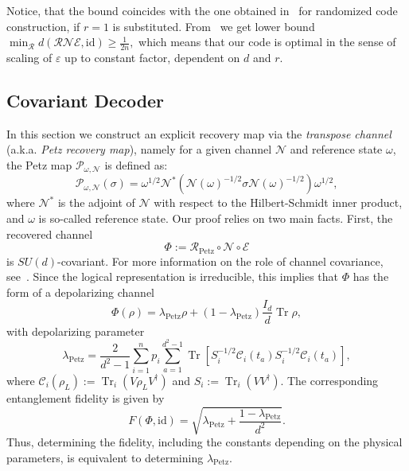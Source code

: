 \documentclass[10pt,twocolumn,superscriptaddress,aps,amsmath,amssymb,citeautoscript,floatfix,prx,longbibliography]{revtex4-2}
\theoremstyle{plain}
\theoremstyle{plain}
\theoremstyle{plain}
\theoremstyle{plain}
\theoremstyle{plain}
\theoremstyle{plain}
\begin{document}
Notice, that the bound coincides with the one obtained in~\cite{Kong2022} for randomized code construction, if $r=1$ is substituted. From~\cite{Faist2020} we get lower bound
$
        \min _{\mathcal{R}} d(\mathcal{R} \mathcal{N} \mathcal{E}, \mathrm{id})\geq \frac{1}{2n},
$
which means that our code is optimal in the sense of scaling of $\varepsilon$ up to constant factor, dependent on $d$ and $r$.

\subsection{Covariant Decoder}\label{subsec:main_decoder}


In this section we construct an explicit recovery map via the \textit{transpose channel} (a.k.a. \textit{Petz recovery map}), namely for a given channel $\mathcal{N}$ and reference state $\omega$, the Petz map $\mathcal{P}_{\omega, \mathcal{N}}$ is defined as:
    \[
        \mathcal{P}_{\omega, \mathcal{N}}(\sigma)=\omega^{1 / 2} \mathcal{N}^*\left(\mathcal{N}(\omega)^{-1 / 2} \sigma \mathcal{N}(\omega)^{-1 / 2}\right) \omega^{1 / 2},
    \]
where $\mathcal{N}^*$ is the adjoint of $\mathcal{N}$ with respect to the Hilbert-Schmidt inner product, and $\omega$ is so-called reference state.
Our proof relies on two main facts. First, the recovered channel
\[
    \Phi:=\mathcal R_{\mathrm{Petz}}\circ \mathcal N\circ \mathcal E
\]
is $SU(d)$-covariant. For more information on the role of channel covariance, see~\cite{Zhou2021, Alexander2025}. Since the logical representation is irreducible, this implies that
\(\Phi\) has the form of a depolarizing channel
\[
    \Phi(\rho)=\lambda_{\mathrm{Petz}} \rho+\left(1-\lambda_{\mathrm{Petz}}\right) \frac{I_d}{d} \operatorname{Tr} \rho,
\]
with depolarizing parameter
\begin{equation}\label{eq:lambda_P}
\lambda_{\mathrm{Petz}} =\frac{2}{d^2-1} \sum_{i=1}^n p_i \sum_{a=1}^{d^2-1} \operatorname{Tr}\left[S_i^{-1 / 2} \mathcal{C}_i\left(t_a\right) S_i^{-1 / 2} \mathcal{C}_i\left(t_a\right)\right],
\end{equation}
where $\mathcal{C}_i\left(\rho_L\right):=\operatorname{Tr}_i\left(V \rho_L V^{\dagger}\right)$ and $S_i:=\operatorname{Tr}_i\left(V V^{\dagger}\right)$. The corresponding entanglement fidelity is given by 
\[
    F(\Phi, \mathrm{id})=\sqrt{\lambda_{\mathrm{Petz}}+\frac{1-\lambda_{\mathrm{Petz}}}{d^2}}.
\]
Thus, determining the fidelity, including the constants depending on the physical parameters, is equivalent to determining \(\lambda_{\mathrm{Petz}}\).
\end{document}
